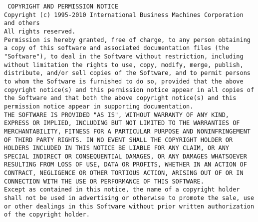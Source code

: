 \setlength{\baselineskip}{0.5\oldbaselineskip}
{\tiny\tt
\noindent
COPYRIGHT AND PERMISSION NOTICE
\\[4pt]
Copyright (c) 1995-2010 International Business Machines Corporation
and others
\\[4pt]
All rights reserved.
\\[4pt]
Permission is hereby granted, free of charge, to any person obtaining
a copy of this software and associated documentation files (the
"Software"), to deal in the Software without restriction, including
without limitation the rights to use, copy, modify, merge, publish,
distribute, and/or sell copies of the Software, and to permit persons
to whom the Software is furnished to do so, provided that the above
copyright notice(s) and this permission notice appear in all copies of
the Software and that both the above copyright notice(s) and this
permission notice appear in supporting documentation.
\\[4pt]
THE SOFTWARE IS PROVIDED "AS IS", WITHOUT WARRANTY OF ANY KIND,
EXPRESS OR IMPLIED, INCLUDING BUT NOT LIMITED TO THE WARRANTIES OF
MERCHANTABILITY, FITNESS FOR A PARTICULAR PURPOSE AND NONINFRINGEMENT
OF THIRD PARTY RIGHTS. IN NO EVENT SHALL THE COPYRIGHT HOLDER OR
HOLDERS INCLUDED IN THIS NOTICE BE LIABLE FOR ANY CLAIM, OR ANY
SPECIAL INDIRECT OR CONSEQUENTIAL DAMAGES, OR ANY DAMAGES WHATSOEVER
RESULTING FROM LOSS OF USE, DATA OR PROFITS, WHETHER IN AN ACTION OF
CONTRACT, NEGLIGENCE OR OTHER TORTIOUS ACTION, ARISING OUT OF OR IN
CONNECTION WITH THE USE OR PERFORMANCE OF THIS SOFTWARE.
\\[4pt]
Except as contained in this notice, the name of a copyright holder
shall not be used in advertising or otherwise to promote the sale, use
or other dealings in this Software without prior written authorization
of the copyright holder.
}


